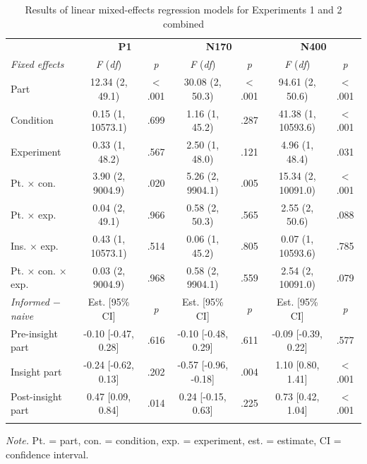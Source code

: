 \documentclass[
  english,
  doc,12pt,twoside,floatsintext]{apa7}
\begin{document}
\begin{table}[tbp]

\begin{center}
\begin{threeparttable}

\caption{\label{tab:joint-table}Results of linear mixed-effects regression models for Experiments 1 and 2 combined}

\footnotesize{

\begin{tabular}{lcccccc}
\toprule
 & \multicolumn{2}{c}{\textbf{P1}} & \multicolumn{2}{c}{\textbf{N170}} & \multicolumn{2}{c}{\textbf{N400}} \\
\cmidrule(r){2-3} \cmidrule(r){4-5} \cmidrule(r){6-7}
\textit{Fixed effects} & \textit{F} (\textit{df}) & \textit{p} & \textit{F} (\textit{df}) & \textit{p} & \textit{F} (\textit{df}) & \textit{p}\\
\midrule
Part & 12.34 (2, 49.1) & < .001 & 30.08 (2, 50.3) & < .001 & 94.61 (2, 50.6) & < .001\\
Condition & 0.15 (1, 10573.1) & .699 & 1.16 (1, 45.2) & .287 & 41.38 (1, 10593.6) & < .001\\
Experiment & 0.33 (1, 48.2) & .567 & 2.50 (1, 48.0) & .121 & 4.96 (1, 48.4) & .031\\
Pt. × con. & 3.90 (2, 9004.9) & .020 & 5.26 (2, 9904.1) & .005 & 15.34 (2, 10091.0) & < .001\\
Pt. × exp. & 0.04 (2, 49.1) & .966 & 0.58 (2, 50.3) & .565 & 2.55 (2, 50.6) & .088\\
Ins. × exp. & 0.43 (1, 10573.1) & .514 & 0.06 (1, 45.2) & .805 & 0.07 (1, 10593.6) & .785\\
Pt. × con. × exp. & 0.03 (2, 9004.9) & .968 & 0.58 (2, 9904.1) & .559 & 2.54 (2, 10091.0) & .079\\
\textit{Informed $-$  naive} & Est. [95\% CI] & \textit{p} & Est. [95\% CI] & \textit{p} & Est. [95\% CI] & \textit{p}\\ \midrule
Pre-insight part & -0.10 [-0.47, 0.28] & .616 & -0.10 [-0.48, 0.29] & .611 & -0.09 [-0.39, 0.22] & .577\\
Insight part & -0.24 [-0.62, 0.13] & .202 & -0.57 [-0.96, -0.18] & .004 & 1.10 [0.80, 1.41] & < .001\\
Post-insight part & 0.47 [0.09, 0.84] & .014 & 0.24 [-0.15, 0.63] & .225 & 0.73 [0.42, 1.04] & < .001\\
\bottomrule
\addlinespace
\end{tabular}

}

\begin{tablenotes}[para]
\normalsize{\textit{Note.} Pt. = part, con. = condition, exp. = experiment, est. = estimate, CI = confidence interval.}
\end{tablenotes}

\end{threeparttable}
\end{center}

\end{table}
\end{document}
